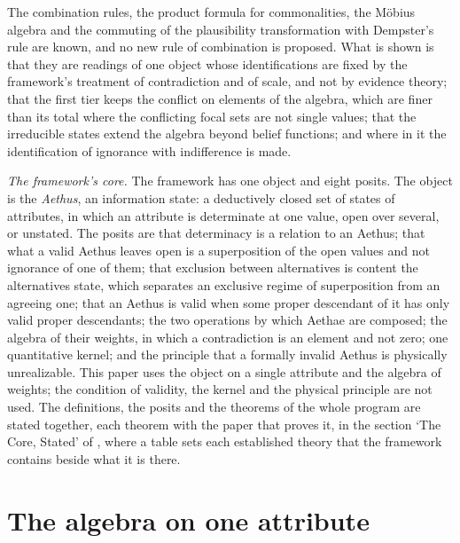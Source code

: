 The combination rules, the product formula for commonalities, the M\"obius algebra and the commuting of the plausibility transformation with Dempster's rule are known, and no new rule of combination is proposed. What is shown is that they are readings of one object whose identifications are fixed by the framework's treatment of contradiction and of scale, and not by evidence theory; that the first tier keeps the conflict on elements of the algebra, which are finer than its total where the conflicting focal sets are not single values; that the irreducible states extend the algebra beyond belief functions; and where in it the identification of ignorance with indifference is made.

\emph{The framework's core.} The framework has one object and eight posits. The object is the \emph{Aethus}, an information state: a deductively closed set of states of attributes, in which an attribute is determinate at one value, open over several, or unstated. The posits are that determinacy is a relation to an Aethus; that what a valid Aethus leaves open is a superposition of the open values and not ignorance of one of them; that exclusion between alternatives is content the alternatives state, which separates an exclusive regime of superposition from an agreeing one; that an Aethus is valid when some proper descendant of it has only valid proper descendants; the two operations by which Aethae are composed; the algebra of their weights, in which a contradiction is an element and not zero; one quantitative kernel; and the principle that a formally invalid Aethus is physically unrealizable. This paper uses the object on a single attribute and the algebra of weights; the condition of validity, the kernel and the physical principle are not used. The definitions, the posits and the theorems of the whole program are stated together, each theorem with the paper that proves it, in the section `The Core, Stated' of \cite{AethusBrief}, where a table sets each established theory that the framework contains beside what it is there.

\section{The algebra on one attribute}\label{sec:fragment}

